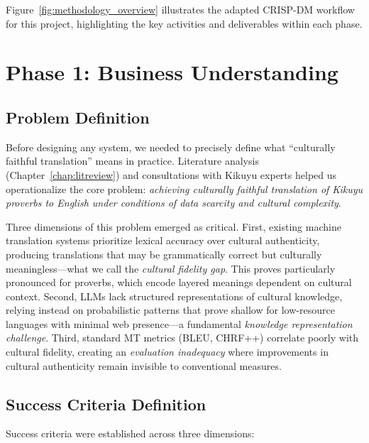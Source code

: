 Figure~\ref{fig:methodology_overview} illustrates the adapted CRISP-DM workflow for this project, highlighting the key activities and deliverables within each phase.


\section{Phase 1: Business Understanding}
\label{sec:phase_business}

\subsection{Problem Definition}
\label{subsec:problem_definition}

Before designing any system, we needed to precisely define what ``culturally faithful translation'' means in practice. Literature analysis (Chapter~\ref{chap:litreview}) and consultations with Kikuyu experts helped us operationalize the core problem: \emph{achieving culturally faithful translation of Kikuyu proverbs to English under conditions of data scarcity and cultural complexity}.

Three dimensions of this problem emerged as critical. First, existing machine translation systems prioritize lexical accuracy over cultural authenticity, producing translations that may be grammatically correct but culturally meaningless—what we call the \emph{cultural fidelity gap}. This proves particularly pronounced for proverbs, which encode layered meanings dependent on cultural context. Second, LLMs lack structured representations of cultural knowledge, relying instead on probabilistic patterns that prove shallow for low-resource languages with minimal web presence—a fundamental \emph{knowledge representation challenge}. Third, standard MT metrics (BLEU, CHRF++) correlate poorly with cultural fidelity, creating an \emph{evaluation inadequacy} where improvements in cultural authenticity remain invisible to conventional measures.

\subsection{Success Criteria Definition}
\label{subsec:success_criteria}

Success criteria were established across three dimensions:

